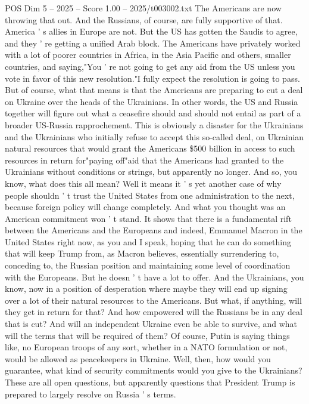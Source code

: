 \begin{textsample}{POS Dim 5 – 2025 – Score 1.00 – 2025/t003002.txt}
The Americans are now throwing that out.
And the Russians, of course, are fully supportive of that.
America ' s allies in Europe are not.
But the US has gotten the Saudis to agree, and they ' re getting a unified Arab block.
The Americans have privately worked with a lot of poorer countries in Africa, in the Asia Pacific and others, smaller countries, and saying,"You ' re not going to get any aid from the US unless you vote in favor of this new resolution."I fully expect the resolution is going to pass.
But of course, what that means is that the Americans are preparing to cut a deal on Ukraine over the heads of the Ukrainians.
In other words, the US and Russia together will figure out what a ceasefire should and should not entail as part of a broader US-Russia rapprochement.
This is obviously a disaster for the Ukrainians and the Ukrainians who initially refuse to accept this so-called deal, on Ukrainian natural resources that would grant the Americans \$500 billion in access to such resources in return for"paying off"aid that the Americans had granted to the Ukrainians without conditions or strings, but apparently no longer.
And so, you know, what does this all mean?
Well it means it ' s yet another case of why people shouldn ' t trust the United States from one administration to the next, because foreign policy will change completely.
And what you thought was an American commitment won ' t stand.
It shows that there is a fundamental rift between the Americans and the Europeans and indeed, Emmanuel Macron in the United States right now, as you and I speak, hoping that he can do something that will keep Trump from, as Macron believes, essentially surrendering to, conceding to, the Russian position and maintaining some level of coordination with the Europeans.
But he doesn ' t have a lot to offer.
And the Ukrainians, you know, now in a position of desperation where maybe they will end up signing over a lot of their natural resources to the Americans.
But what, if anything, will they get in return for that?
And how empowered will the Russians be in any deal that is cut?
And will an independent Ukraine even be able to survive, and what will the terms that will be required of them?
Of course, Putin is saying things like, no European troops of any sort, whether in a NATO formulation or not, would be allowed as peacekeepers in Ukraine.
Well, then, how would you guarantee, what kind of security commitments would you give to the Ukrainians?
These are all open questions, but apparently questions that President Trump is prepared to largely resolve on Russia ' s terms.

\end{textsample}
